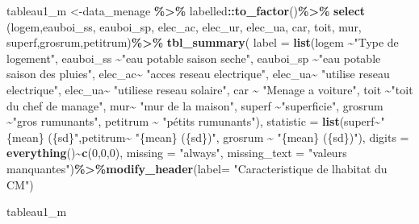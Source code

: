 \documentclass[
]{article}
\newenvironment{Shaded}{\begin{snugshade}}{\end{snugshade}}
\newcommand{\AttributeTok}[1]{\textcolor[rgb]{0.13,0.29,0.53}{#1}}
\newcommand{\DecValTok}[1]{\textcolor[rgb]{0.00,0.00,0.81}{#1}}
\newcommand{\FunctionTok}[1]{\textcolor[rgb]{0.13,0.29,0.53}{\textbf{#1}}}
\newcommand{\NormalTok}[1]{#1}
\newcommand{\OtherTok}[1]{\textcolor[rgb]{0.56,0.35,0.01}{#1}}
\newcommand{\SpecialCharTok}[1]{\textcolor[rgb]{0.81,0.36,0.00}{\textbf{#1}}}
\newcommand{\StringTok}[1]{\textcolor[rgb]{0.31,0.60,0.02}{#1}}
\begin{document}
\begin{Shaded}
\begin{Highlighting}[]
\NormalTok{tableau1\_m }\OtherTok{\textless{}{-}}\NormalTok{data\_menage }\SpecialCharTok{\%\textgreater{}\%} 
\NormalTok{  labelled}\SpecialCharTok{::}\FunctionTok{to\_factor}\NormalTok{()}\SpecialCharTok{\%\textgreater{}\%}
  \FunctionTok{select}\NormalTok{ (logem,eauboi\_ss, eauboi\_sp, elec\_ac, elec\_ur, elec\_ua, car, toit, mur, superf,grosrum,petitrum)}\SpecialCharTok{\%\textgreater{}\%} 
  \FunctionTok{tbl\_summary}\NormalTok{(}
    \AttributeTok{label =} \FunctionTok{list}\NormalTok{(logem }\SpecialCharTok{\textasciitilde{}}\StringTok{"Type de logement"}\NormalTok{, }
\NormalTok{            eauboi\_ss }\SpecialCharTok{\textasciitilde{}}\StringTok{"eau potable saison seche"}\NormalTok{,}
\NormalTok{            eauboi\_sp }\SpecialCharTok{\textasciitilde{}}\StringTok{"eau potable saison des pluies"}\NormalTok{,}
\NormalTok{            elec\_ac}\SpecialCharTok{\textasciitilde{}} \StringTok{"acces reseau electrique"}\NormalTok{,}
\NormalTok{            elec\_ua}\SpecialCharTok{\textasciitilde{}} \StringTok{"utilise reseau electrique"}\NormalTok{,}
\NormalTok{            elec\_ua}\SpecialCharTok{\textasciitilde{}} \StringTok{"utiliese reseau solaire"}\NormalTok{,}
\NormalTok{            car }\SpecialCharTok{\textasciitilde{}} \StringTok{"Menage a voiture"}\NormalTok{,}
\NormalTok{            toit }\SpecialCharTok{\textasciitilde{}}\StringTok{"toit du chef de manage"}\NormalTok{, }
\NormalTok{            mur}\SpecialCharTok{\textasciitilde{}} \StringTok{"mur de la maison"}\NormalTok{, }
\NormalTok{            superf }\SpecialCharTok{\textasciitilde{}}\StringTok{"superficie"}\NormalTok{, }
\NormalTok{            grosrum }\SpecialCharTok{\textasciitilde{}}\StringTok{"gros rumunants"}\NormalTok{, }
\NormalTok{            petitrum }\SpecialCharTok{\textasciitilde{}} \StringTok{"pétits rumunants"}\NormalTok{), }
  \AttributeTok{statistic =} \FunctionTok{list}\NormalTok{(superf}\SpecialCharTok{\textasciitilde{}}\StringTok{"\{mean\} (\{sd\}"}\NormalTok{,petitrum}\SpecialCharTok{\textasciitilde{}} \StringTok{"\{mean\} (\{sd\})"}\NormalTok{, grosrum }\SpecialCharTok{\textasciitilde{}} \StringTok{"\{mean\} (\{sd\})"}\NormalTok{),}
  \AttributeTok{digits =} \FunctionTok{everything}\NormalTok{()}\SpecialCharTok{\textasciitilde{}}\FunctionTok{c}\NormalTok{(}\DecValTok{0}\NormalTok{,}\DecValTok{0}\NormalTok{,}\DecValTok{0}\NormalTok{),}
  \AttributeTok{missing =} \StringTok{"always"}\NormalTok{,}
  \AttributeTok{missing\_text =} \StringTok{"valeurs manquantes"}\NormalTok{)}\SpecialCharTok{\%\textgreater{}\%}\FunctionTok{modify\_header}\NormalTok{(}\AttributeTok{label=} \StringTok{"Caracteristique de l\textquotesingle{}habitat du CM"}\NormalTok{)}

\NormalTok{tableau1\_m}
\end{Highlighting}
\end{Shaded}
\end{document}
